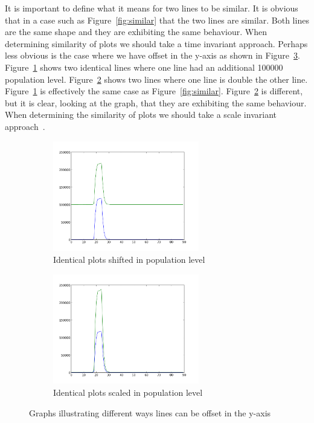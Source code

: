 It is important to define what it means for two lines to be similar.  It is obvious that in a case such as Figure~\ref{fig:similar} that the two lines are similar.  Both lines are the same shape and they are exhibiting the same behaviour.  When determining similarity of plots we should take a time invariant approach.  Perhaps less obvious is the case where we have offset in the y-axis as shown in Figure~\ref{fig:similar_y}.  Figure~\ref{fig:similar_1} shows two identical lines where one line had an additional 100000 population level.  Figure~\ref{fig:similar_2} shows two lines where one line is double the other line.  Figure~\ref{fig:similar_1} is effectively the same case as Figure~\ref{fig:similar}.  Figure~\ref{fig:similar_2} is different, but it is clear, looking at the graph, that they are exhibiting the same behaviour. When determining the similarity of plots we should take a scale invariant approach~\cite{esling}.

\begin{figure}[h!]
    \centering
    \begin{subfigure}[b]{0.6\textwidth}
        \centering
        \includegraphics[width=0.7\textwidth]{images/similar_plots_2.png}
        \caption{Identical plots shifted in population level}
        \label{fig:similar_1}
    \end{subfigure}

    \begin{subfigure}[b]{0.6\textwidth}
        \centering
        \includegraphics[width=0.7\textwidth]{images/similar_plots_3.png}
        \caption{Identical plots scaled in population level}
        \label{fig:similar_2}
    \end{subfigure}
    \caption{Graphs illustrating different ways lines can be offset in the y-axis}
    \label{fig:similar_y}
\end{figure}

